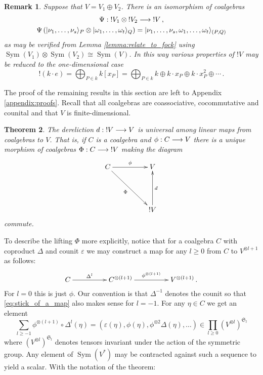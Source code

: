 \documentclass[english,letter paper,12pt,reqno]{article}
\DeclarePairedDelimiter\ket{\lvert}{\rangle}
\newtheorem{theorem}{Theorem}[section]
\theoremstyle{example}
\newtheorem{remark}[theorem]{Remark}
\numberwithin{equation}{section}
\DeclareMathOperator{\Sym}{Sym}
\begin{document}
\begin{remark}\label{remark_additive_iso} Suppose that $V = V_1 \oplus V_2$. There is an isomorphism of coalgebras
\begin{gather*}
\Psi: {!} V_1 \otimes {!} V_2 \lto {!} V\,,\\
\Psi\left( \ket{\nu_1,\ldots,\nu_s}_P \otimes \ket{\omega_1,\ldots,\omega_t}_Q \right) = \ket{\nu_1,\ldots,\nu_s,\omega_1,\ldots,\omega_t}_{(P,Q)}
\end{gather*}
as may be verified from Lemma \ref{lemma:relate_to_fock} using $\Sym(V_1) \otimes \Sym(V_2) \cong \Sym(V)$. In this way various properties of ${!} V$ may be reduced to the one-dimensional case
\[
{!} ( k \cdot e ) = \bigoplus_{P \in k} k[x_P] = \bigoplus_{P \in k} k \oplus k \cdot x_P \oplus k \cdot x_P^2 \oplus \cdots\,.
\]
\end{remark}

The proof of the remaining results in this section are left to Appendix \ref{appendix:proofs}. Recall that all coalgebras are coassociative, cocommutative and counital and that $V$ is finite-dimensional.

\begin{theorem}\label{theorem:main} The dereliction $d: {!}V \longrightarrow V$ is universal among linear maps from coalgebras to $V$. That is, if $C$ is a coalgebra and $\phi: C \longrightarrow V$ there is a unique morphism of coalgebras $\Phi: C \longrightarrow {!}V$ making the diagram
\begin{equation}\label{eq:defining_philift2}
\xymatrix@C+2pc@R+2pc{
C \ar[r]^-{\phi}\ar[dr]_-{\Phi} & V\\
& {!}V \ar[u]_-{d}
}
\end{equation}
commute.
\end{theorem}

To describe the lifting $\Phi$ more explicitly, notice that for a coalgebra $C$ with coproduct $\Delta$ and counit $\varepsilon$ we may construct a map for any $l \ge 0$ from $C$ to $V^{\otimes l+1}$ as follows:
\begin{equation}\label{eq:stick_of_a_map}
\xymatrix@C+2pc{
C \ar[r]^-{\Delta^l} & C^{\otimes (l+1)} \ar[r]^-{\phi^{\otimes (l+1)}} & V^{\otimes (l+1)}\,.
}
\end{equation}
For $l = 0$ this is just $\phi$. Our convention is that $\Delta^{-1}$ denotes the counit so that \eqref{eq:stick_of_a_map} also makes sense for $l = -1$. For any $\eta \in C$ we get an element
\begin{equation}\label{eq:sequence_of_powers}
\sum_{l \ge -1} \phi^{\otimes (l+1)} \circ \Delta^l(\eta) = ( \varepsilon(\eta), \phi(\eta), \phi^{\otimes 2} \Delta(\eta), \ldots ) \in \prod_{l \ge 0} (V^{\otimes l})^{\mathfrak{S}_l}
\end{equation}
where $(V^{\otimes l})^{\mathfrak{S}_l}$ denotes tensors invariant under the action of the symmetric group. Any element of $\Sym(V^*)$ may be contracted against such a sequence to yield a scalar. With the notation of the theorem:
\end{document}
